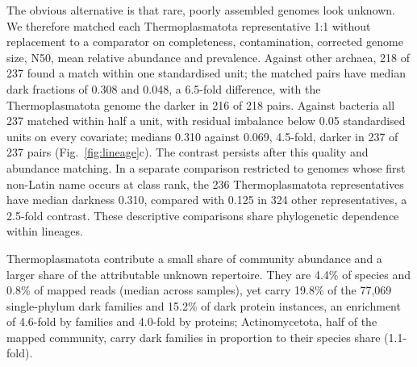 \documentclass[11pt]{article}
\begin{document}
The obvious alternative is that rare, poorly assembled genomes look unknown. We therefore matched
each Thermoplasmatota representative 1:1 without replacement to a comparator on completeness,
contamination, corrected genome size, N50, mean relative abundance and prevalence. Against other
archaea, 218 of 237 found a match within one standardised unit; the matched pairs have median dark
fractions of 0.308 and 0.048, a 6.5-fold difference, with the Thermoplasmatota genome the darker in
216 of 218 pairs. Against bacteria all 237 matched within half a unit, with residual imbalance below
0.05 standardised units on every covariate; medians 0.310 against 0.069, 4.5-fold, darker in 237 of
237 pairs (Fig.~\ref{fig:lineage}c). The contrast persists after this quality and abundance matching. In a separate comparison
restricted to genomes whose first non-Latin name occurs at class rank, the 236
Thermoplasmatota representatives have median darkness 0.310, compared with 0.125 in 324 other
representatives, a 2.5-fold contrast. These descriptive comparisons share phylogenetic dependence
within lineages.

Thermoplasmatota contribute a small share of community abundance and a larger share of the
attributable unknown repertoire. They are 4.4\%
of species and 0.8\% of mapped reads (median across samples), yet carry 19.8\% of the 77{,}069
single-phylum dark families and 15.2\% of dark protein instances, an enrichment of 4.6-fold by
families and 4.0-fold by proteins; Actinomycetota, half of the mapped community, carry dark families
in proportion to their species share (1.1-fold).
\end{document}

